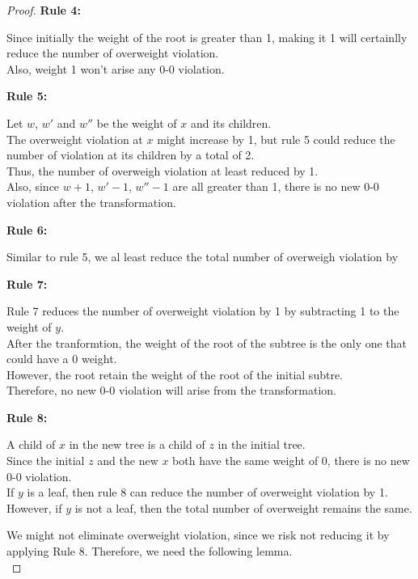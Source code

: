 \documentclass[10pt]{article}
\begin{document}
\begin{enumerate}
\begin{proof}
	\textbf{Rule 4:}
	\begin{addmargin}[1em]{0em}
		Since initially the weight of the root is greater than 1, making it 1
		will certainlly reduce the number of overweight violation. \\
		Also, weight 1 won't arise any 0-0 violation.
	\end{addmargin}
	\textbf{Rule 5:}
	\begin{addmargin}[1em]{0em}
		Let $w$, $w'$ and $w''$ be the weight of $x$ and its children. \\
		The overweight violation at $x$ might increase by 1, but rule 5 could
		reduce the number of violation at its children by a total of 2. \\
		Thus, the number of overweigh violation at least reduced by 1. \\
		Also, since $w+1$, $w'-1$, $w''-1$ are all greater than 1, there is no
		new 0-0 violation after the transformation. 
	\end{addmargin}
	\textbf{Rule 6:}
	\begin{addmargin}[1em]{0em}
		Similar to rule 5, we al least reduce the total number of overweigh
		violation by 
	\end{addmargin}
	\textbf{Rule 7:}
	\begin{addmargin}[1em]{0em}
		Rule 7 reduces the number of overweight violation by 1 by subtracting 1
		to the weight of $y$. \\
		After the tranformtion, the weight of the root of the subtree is the
		only one that could have a 0 weight. \\
		However, the root retain the weight of the root of the initial subtre.
		\\
		Therefore, no new 0-0 violation will arise from the transformation.
	\end{addmargin}
	\textbf{Rule 8:}
	\begin{addmargin}[1em]{0em}
		A child of $x$ in the new tree is a child of $z$ in the initial tree.
		\\
		Since the initial $z$ and the new $x$ both have the same weight of 0,
		there is no new 0-0 violation. \\
		If $y$ is a leaf, then rule 8 can reduce the number of overweight
		violation by 1. \\
		However, if $y$ is not a leaf, then the total number of overweight
		remains the same. 
	\end{addmargin}

	We might not eliminate overweight violation, since we risk not reducing it
	by applying Rule 8. Therefore, we need the following lemma. \\


\end{proof}
\end{enumerate}
\end{document}
